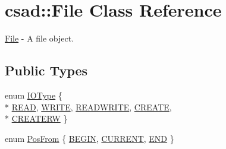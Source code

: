 \hypertarget{classcsad_1_1_file}{\section{csad\-:\-:File Class Reference}
\label{classcsad_1_1_file}
}


\hyperlink{classcsad_1_1_file}{File} -\/ A file object.  


\subsection*{Public Types}
\begin{DoxyCompactItemize}
\item 
enum \hyperlink{classcsad_1_1_file_a0c256c83ef20258eb8d22826e5915d5a}{I\-O\-Type} \{ \\*
\hyperlink{classcsad_1_1_file_a0c256c83ef20258eb8d22826e5915d5aad43f934455c63c17c3fb53cfe87eb4c8}{R\-E\-A\-D}, 
\hyperlink{classcsad_1_1_file_a0c256c83ef20258eb8d22826e5915d5aa297c373b4f92bf6a3586bdffe5c7ae7e}{W\-R\-I\-T\-E}, 
\hyperlink{classcsad_1_1_file_a0c256c83ef20258eb8d22826e5915d5aa98b61d0244be5ae4a22f32e37587a339}{R\-E\-A\-D\-W\-R\-I\-T\-E}, 
\hyperlink{classcsad_1_1_file_a0c256c83ef20258eb8d22826e5915d5aad0cc31e4c4e141695820637b226c30b5}{C\-R\-E\-A\-T\-E}, 
\\*
\hyperlink{classcsad_1_1_file_a0c256c83ef20258eb8d22826e5915d5aa6bc34ec5986a01f26fe2f71ba41e7fbb}{C\-R\-E\-A\-T\-E\-R\-W}
 \}
\item 
enum \hyperlink{classcsad_1_1_file_aec12a732c41b7586f7bff0925b4deb97}{Pos\-From} \{ \hyperlink{classcsad_1_1_file_aec12a732c41b7586f7bff0925b4deb97a4e995e5b070608e33741709308793835}{B\-E\-G\-I\-N}, 
\hyperlink{classcsad_1_1_file_aec12a732c41b7586f7bff0925b4deb97a61b4d3f9c0706ff9b3a4ee2f177c1edb}{C\-U\-R\-R\-E\-N\-T}, 
\hyperlink{classcsad_1_1_file_aec12a732c41b7586f7bff0925b4deb97a9ca1c0d65d2bdb2a970afabe96303609}{E\-N\-D}
 \}
\end{DoxyCompactItemize}
